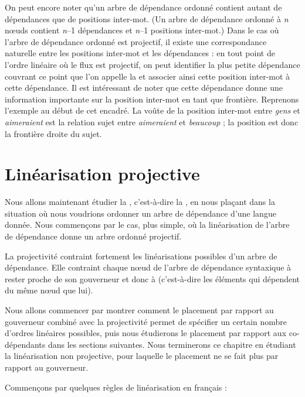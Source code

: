 {    On peut encore noter qu'un arbre de dépendance ordonné contient autant de dépendances que de positions inter-mot. (Un arbre de dépendance ordonné à \textit{n} nœuds contient \textit{n}–1 dépendances et \textit{n}–1 positions inter-mot.) Dans le cas où l'arbre de dépendance ordonné est projectif, il existe une correspondance naturelle entre les positions inter-mot et les dépendances : en tout point de l’ordre linéaire où le flux est projectif, on peut identifier la plus petite dépendance couvrant ce point que l’on appelle la  et associer ainsi cette position inter-mot à cette dépendance. Il est intéressant de noter que cette dépendance donne une information importante sur la position inter-mot en tant que frontière. Reprenons l’exemple au début de cet encadré. La voûte de la position inter-mot entre \textit{gens} et \textit{aimeraient} est la relation sujet entre \textit{aimeraient} et \textit{beaucoup} ; la position est donc la frontière droite du sujet.
}
\section{Linéarisation projective}\label{sec:3.5.18}

Nous allons maintenant étudier la , c’est-à-dire la , en nous plaçant dans la situation où nous voudrions ordonner un arbre de dépendance d’une langue donnée. Nous commençons par le cas, plus simple, où la linéarisation de l’arbre de dépendance donne un arbre ordonné projectif.

La projectivité contraint fortement les linéarisations possibles d’un arbre de dépendance. Elle contraint chaque nœud de l’arbre de dépendance syntaxique à rester proche de son gouverneur et donc à  (c’est-à-dire les éléments qui dépendent du même nœud que lui).

Nous allons commencer par montrer comment le placement par rapport au gouverneur combiné avec la projectivité permet de spécifier un certain nombre d’ordres linéaires possibles, puis nous étudierons le placement par rapport aux co-dépendants dans les sections suivantes. Nous terminerons ce chapitre en étudiant la linéarisation non projective, pour laquelle le placement ne se fait plus par rapport au gouverneur.


Commençons par quelques règles de linéarisation en français :

